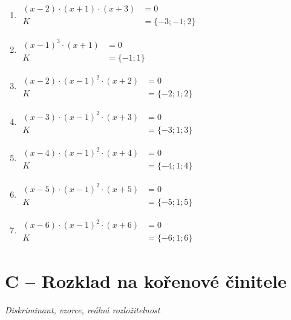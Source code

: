 \documentclass[11pt,a4paper]{article}
\begin{document}
\begin{enumerate}[label={},itemsep=9pt]
\item[\textbf{B008}] \(\displaystyle \begin{aligned}\left(x - 2\right) \cdot \left(x + 1\right) \cdot \left(x + 3\right)&=0\\K&=\{-3;-1;2\}\end{aligned}\)\par
\item[\textbf{B009}] \(\displaystyle \begin{aligned}\left(x - 1\right)^{3} \cdot \left(x + 1\right)&=0\\K&=\{-1;1\}\end{aligned}\)\par
\item[\textbf{B010}] \(\displaystyle \begin{aligned}\left(x - 2\right) \cdot \left(x - 1\right)^{2} \cdot \left(x + 2\right)&=0\\K&=\{-2;1;2\}\end{aligned}\)\par
\item[\textbf{B011}] \(\displaystyle \begin{aligned}\left(x - 3\right) \cdot \left(x - 1\right)^{2} \cdot \left(x + 3\right)&=0\\K&=\{-3;1;3\}\end{aligned}\)\par
\item[\textbf{B012}] \(\displaystyle \begin{aligned}\left(x - 4\right) \cdot \left(x - 1\right)^{2} \cdot \left(x + 4\right)&=0\\K&=\{-4;1;4\}\end{aligned}\)\par
\item[\textbf{B013}] \(\displaystyle \begin{aligned}\left(x - 5\right) \cdot \left(x - 1\right)^{2} \cdot \left(x + 5\right)&=0\\K&=\{-5;1;5\}\end{aligned}\)\par
\item[\textbf{B014}] \(\displaystyle \begin{aligned}\left(x - 6\right) \cdot \left(x - 1\right)^{2} \cdot \left(x + 6\right)&=0\\K&=\{-6;1;6\}\end{aligned}\)\par
\end{enumerate}
\section*{C -- Rozklad na kořenové činitele}
\textit{Diskriminant, vzorce, reálná rozložitelnost}
\end{document}
